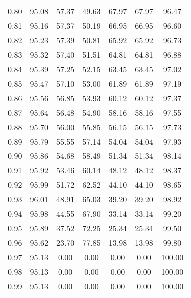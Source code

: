 \begin{tabular}{|c|c|c|c|c|c|c|}
      0.80 &     95.08 &     57.37 &      49.63 &   67.97 &      67.97 &         96.47 \\
      0.81 &     95.16 &     57.37 &      50.19 &   66.95 &      66.95 &         96.60 \\
      0.82 &     95.23 &     57.39 &      50.81 &   65.92 &      65.92 &         96.73 \\
      0.83 &     95.32 &     57.40 &      51.51 &   64.81 &      64.81 &         96.88 \\
      0.84 &     95.39 &     57.25 &      52.15 &   63.45 &      63.45 &         97.02 \\
      0.85 &     95.47 &     57.10 &      53.00 &   61.89 &      61.89 &         97.19 \\
      0.86 &     95.56 &     56.85 &      53.93 &   60.12 &      60.12 &         97.37 \\
      0.87 &     95.64 &     56.48 &      54.90 &   58.16 &      58.16 &         97.55 \\
      0.88 &     95.70 &     56.00 &      55.85 &   56.15 &      56.15 &         97.73 \\
      0.89 &     95.79 &     55.55 &      57.14 &   54.04 &      54.04 &         97.93 \\
      0.90 &     95.86 &     54.68 &      58.49 &   51.34 &      51.34 &         98.14 \\
      0.91 &     95.92 &     53.46 &      60.14 &   48.12 &      48.12 &         98.37 \\
      0.92 &     95.99 &     51.72 &      62.52 &   44.10 &      44.10 &         98.65 \\
      0.93 &     96.01 &     48.91 &      65.03 &   39.20 &      39.20 &         98.92 \\
      0.94 &     95.98 &     44.55 &      67.90 &   33.14 &      33.14 &         99.20 \\
      0.95 &     95.89 &     37.52 &      72.25 &   25.34 &      25.34 &         99.50 \\
      0.96 &     95.62 &     23.70 &      77.85 &   13.98 &      13.98 &         99.80 \\
      0.97 &     95.13 &      0.00 &       0.00 &    0.00 &       0.00 &        100.00 \\
      0.98 &     95.13 &      0.00 &       0.00 &    0.00 &       0.00 &        100.00 \\
      0.99 &     95.13 &      0.00 &       0.00 &    0.00 &       0.00 &        100.00 \\
\bottomrule
\end{tabular}
